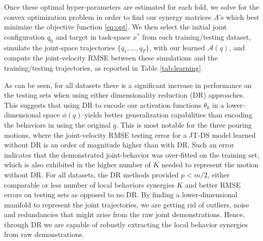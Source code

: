\documentclass[letterpaper, 10 pt, journal, twoside, fleqn]{IEEEtran}
\begin{document}
Once these optimal hyper-parameters are estimated for each fold, we solve for the convex optimization problem in order to find our synergy matrices $A$'s which best minimize the objective function \eqref{eq:opt}. We then select the initial joint configuration $q_0$ and target in task-space $x^*$ from each training/testing dataset, simulate the joint-space trajectories $\{\dot{q_1},\dots,\dot{q_T}\}$, with our learned $\mathcal{A}(q)$, and compute the joint-velocity RMSE between these simulations and the training/testing trajectories, as reported in Table \ref{tab:learning}.

As can be seen, for all datasets there is a significant increase in performance on the testing sets when using either dimensionality reduction (DR) approaches. This suggests that using DR to encode our activation functions $\theta_k$ in a lower-dimensional space $\phi(q)$ yields better generalization capabilities than encoding the behaviors in using the original $q$. This is most notable for the three pouring motions, where the joint-velocity RMSE testing error for a JT-DS model learned without DR is an order of magnitude higher than with DR. Such an error indicates that the demonstrated joint-behavior was over-fitted on the training set, which is also exhibited in the higher number of $K$ needed to represent the motion without DR. For all datasets, the DR methods provided $p < m/2$, either comparable or less number of local behaviors synergies $K$ and better RMSE errors on testing sets as opposed to no DR. By finding a lower-dimensional manifold to represent the joint trajectories, we are getting rid of outliers, noise and redundancies that might arise from the raw joint demonstrations. Hence, through DR we are capable of robustly extracting the local behavior synergies from raw demonstrations. 
\end{document}
